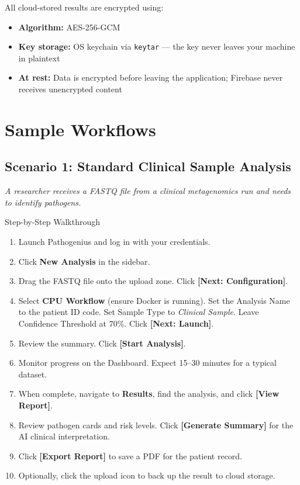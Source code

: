 \documentclass[12pt,a4paper]{report}
\newcommand{\btn}[1]{\textbf{\textcolor{primary}{[#1]}}}
\begin{document}
All cloud-stored results are encrypted using:
\begin{itemize}[leftmargin=1.5em]
  \item \textbf{Algorithm:} AES-256-GCM
  \item \textbf{Key storage:} OS keychain via \texttt{keytar} — the key never leaves your machine in plaintext
  \item \textbf{At rest:} Data is encrypted before leaving the application; Firebase never receives unencrypted content
\end{itemize}

\chapter{Sample Workflows}

\section{Scenario 1: Standard Clinical Sample Analysis}

\textit{A researcher receives a FASTQ file from a clinical metagenomics run and needs to identify pathogens.}

\begin{stepbox}{Step-by-Step Walkthrough}
\begin{enumerate}[leftmargin=1em, itemsep=2pt]
  \item Launch Pathogenius and log in with your credentials.
  \item Click \textbf{New Analysis} in the sidebar.
  \item Drag the FASTQ file onto the upload zone. Click \btn{Next: Configuration}.
  \item Select \textbf{CPU Workflow} (ensure Docker is running). Set the Analysis Name to the patient ID code. Set Sample Type to \textit{Clinical Sample}. Leave Confidence Threshold at 70\%. Click \btn{Next: Launch}.
  \item Review the summary. Click \btn{Start Analysis}.
  \item Monitor progress on the Dashboard. Expect 15--30 minutes for a typical dataset.
  \item When complete, navigate to \textbf{Results}, find the analysis, and click \btn{View Report}.
  \item Review pathogen cards and risk levels. Click \btn{Generate Summary} for the AI clinical interpretation.
  \item Click \btn{Export Report} to save a PDF for the patient record.
  \item Optionally, click the upload icon to back up the result to cloud storage.
\end{enumerate}
\end{stepbox}
\end{document}
